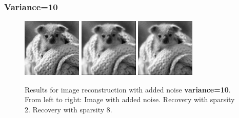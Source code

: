 \documentclass{article}
\begin{document}
\subsubsection*{Variance=10}
\begin{figure}[H]
    \captionsetup{width=.5\linewidth}
    \centering
        \includegraphics[width=0.25\textwidth]{images/koala_noise-10.png}
        \includegraphics[width=0.25\textwidth]{images/koala_noise-10-recovered_02.png}
        \includegraphics[width=0.25\textwidth]{images/koala_noise-10-recovered_08.png}
        \caption{Results for image reconstruction with added noise {\bf variance=10}. From left to right: Image with added noise. Recovery with sparsity 2. Recovery with sparsity 8.}
\end{figure}


\newpage
\end{document}
